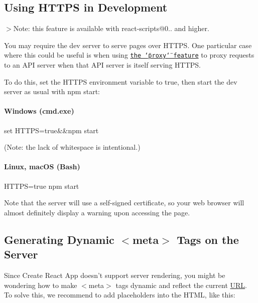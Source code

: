 \subsection*{Using H\+T\+T\+PS in Development}

$>$Note\+: this feature is available with {\ttfamily react-\/scripts@0..} and higher.

You may require the dev server to serve pages over H\+T\+T\+PS. One particular case where this could be useful is when using \href{#proxying-api-requests-in-development}{\tt the \char`\"{}proxy\char`\"{} feature} to proxy requests to an A\+PI server when that A\+PI server is itself serving H\+T\+T\+PS.

To do this, set the {\ttfamily H\+T\+T\+PS} environment variable to {\ttfamily true}, then start the dev server as usual with {\ttfamily npm start}\+:

\paragraph*{Windows (cmd.\+exe)}


\begin{DoxyCode}
set HTTPS=true&&npm start
\end{DoxyCode}


(Note\+: the lack of whitespace is intentional.)

\paragraph*{Linux, mac\+OS (Bash)}


\begin{DoxyCode}
HTTPS=true npm start
\end{DoxyCode}


Note that the server will use a self-\/signed certificate, so your web browser will almost definitely display a warning upon accessing the page.

\subsection*{Generating Dynamic {\ttfamily $<$meta$>$} Tags on the Server}

Since Create React App doesn’t support server rendering, you might be wondering how to make {\ttfamily $<$meta$>$} tags dynamic and reflect the current \mbox{\hyperlink{namespace_u_r_l}{U\+RL}}. To solve this, we recommend to add placeholders into the H\+T\+ML, like this\+:


